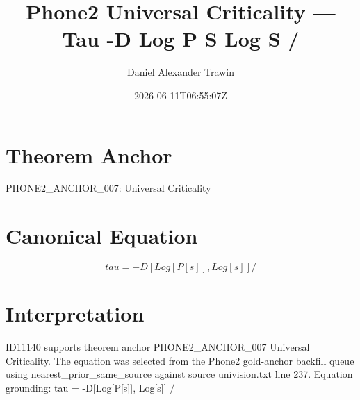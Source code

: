 \documentclass[11pt]{article}
\title{Phone2 Universal Criticality — Tau -D Log P S Log S /}
\author{Daniel Alexander Trawin}
\date{2026-06-11T06:55:07Z}
\begin{document}
\maketitle
\section*{Theorem Anchor}
PHONE2_ANCHOR_007: Universal Criticality
\section*{Canonical Equation}
\[
tau = -D[Log[P[s]], Log[s]] /
\]
\section*{Interpretation}
ID11140 supports theorem anchor PHONE2_ANCHOR_007 Universal Criticality. The equation was selected from the Phone2 gold-anchor backfill queue using nearest_prior_same_source against source univision.txt line 237. Equation grounding: tau = -D[Log[P[s]], Log[s]] /
\end{document}
